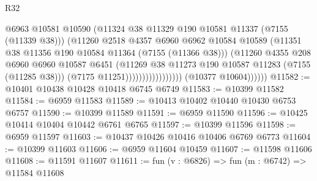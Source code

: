 \begin{lexlean}{R32}
\begin{coremodule}
                                          @6963
                                          @10581
                                          @10590
                                          (@11324
                                            @38
                                            @11329
                                            @190
                                            @10581
                                            @11337
                                            (@7155 (@11339 @38)))
                                          (@11260
                                            @2518
                                            @4357
                                            @6960
                                            @6962
                                            @10584
                                            @10589
                                            (@11351
                                              @38
                                              @11356
                                              @190
                                              @10584
                                              @11364
                                              (@7155 (@11366 @38)))
                                            (@11260
                                              @4355
                                              @208
                                              @6960
                                              @6960
                                              @10587
                                              @6451
                                              (@11269
                                                @38
                                                @11273
                                                @190
                                                @10587
                                                @11283
                                                (@7155 (@11285 @38)))
                                              (@7175 @11251)))))))))))))))))
              (@10377 @10604))))))
@11582 := @10401 @10438 @10428 @10418 @6745 @6749
@11583 := @10399 @11582
@11584 := @6959 @11583
@11589 := @10413 @10402 @10440 @10430 @6753 @6757
@11590 := @10399 @11589
@11591 := @6959 @11590
@11596 := @10425 @10414 @10404 @10442 @6761 @6765
@11597 := @10399 @11596
@11598 := @6959 @11597
@11603 := @10437 @10426 @10416 @10406 @6769 @6773
@11604 := @10399 @11603
@11606 := @6959 @11604 @10459
@11607 := @11598 @11606
@11608 := @11591 @11607
@11611 := fun (v : @6826) => fun (m : @6742) => @11584 @11608

\end{coremodule}
\end{lexlean}
